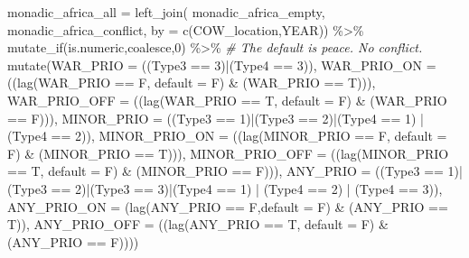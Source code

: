 \documentclass[
]{article}
\newenvironment{Shaded}{\begin{snugshade}}{\end{snugshade}}
\newcommand{\AttributeTok}[1]{\textcolor[rgb]{0.77,0.63,0.00}{#1}}
\newcommand{\CommentTok}[1]{\textcolor[rgb]{0.56,0.35,0.01}{\textit{#1}}}
\newcommand{\DecValTok}[1]{\textcolor[rgb]{0.00,0.00,0.81}{#1}}
\newcommand{\FunctionTok}[1]{\textcolor[rgb]{0.00,0.00,0.00}{#1}}
\newcommand{\NormalTok}[1]{#1}
\newcommand{\OtherTok}[1]{\textcolor[rgb]{0.56,0.35,0.01}{#1}}
\newcommand{\SpecialCharTok}[1]{\textcolor[rgb]{0.00,0.00,0.00}{#1}}
\newcommand{\StringTok}[1]{\textcolor[rgb]{0.31,0.60,0.02}{#1}}
\begin{document}
\begin{Shaded}
\begin{Highlighting}[]
\NormalTok{monadic\_africa\_all }\OtherTok{=} \FunctionTok{left\_join}\NormalTok{(}
\NormalTok{  monadic\_africa\_empty, }
\NormalTok{  monadic\_africa\_conflict, }
  \AttributeTok{by =} \FunctionTok{c}\NormalTok{(}\StringTok{\textquotesingle{}COW\_location\textquotesingle{}}\NormalTok{,}\StringTok{\textquotesingle{}YEAR\textquotesingle{}}\NormalTok{))  }\SpecialCharTok{\%\textgreater{}\%} 
  \FunctionTok{mutate\_if}\NormalTok{(is.numeric,coalesce,}\DecValTok{0}\NormalTok{) }\SpecialCharTok{\%\textgreater{}\%} \CommentTok{\# The default is peace. No conflict.}
  \FunctionTok{mutate}\NormalTok{(}\AttributeTok{WAR\_PRIO =}\NormalTok{ ((Type3 }\SpecialCharTok{==} \DecValTok{3}\NormalTok{)}\SpecialCharTok{|}\NormalTok{(Type4 }\SpecialCharTok{==} \DecValTok{3}\NormalTok{)), }
         \AttributeTok{WAR\_PRIO\_ON =}\NormalTok{ ((}\FunctionTok{lag}\NormalTok{(WAR\_PRIO }\SpecialCharTok{==}\NormalTok{ F, }\AttributeTok{default =}\NormalTok{ F) }\SpecialCharTok{\&}\NormalTok{ (WAR\_PRIO }\SpecialCharTok{==}\NormalTok{ T))),}
         \AttributeTok{WAR\_PRIO\_OFF =}\NormalTok{ ((}\FunctionTok{lag}\NormalTok{(WAR\_PRIO }\SpecialCharTok{==}\NormalTok{ T, }\AttributeTok{default =}\NormalTok{ F) }\SpecialCharTok{\&}\NormalTok{ (WAR\_PRIO }\SpecialCharTok{==}\NormalTok{ F))), }
         \AttributeTok{MINOR\_PRIO =}\NormalTok{ ((Type3 }\SpecialCharTok{==} \DecValTok{1}\NormalTok{)}\SpecialCharTok{|}\NormalTok{(Type3 }\SpecialCharTok{==} \DecValTok{2}\NormalTok{)}\SpecialCharTok{|}\NormalTok{(Type4 }\SpecialCharTok{==} \DecValTok{1}\NormalTok{) }\SpecialCharTok{|}\NormalTok{ (Type4 }\SpecialCharTok{==} \DecValTok{2}\NormalTok{)), }
         \AttributeTok{MINOR\_PRIO\_ON =}\NormalTok{ ((}\FunctionTok{lag}\NormalTok{(MINOR\_PRIO }\SpecialCharTok{==}\NormalTok{ F, }\AttributeTok{default =}\NormalTok{ F) }\SpecialCharTok{\&}\NormalTok{ (MINOR\_PRIO }\SpecialCharTok{==}\NormalTok{ T))), }
         \AttributeTok{MINOR\_PRIO\_OFF =}\NormalTok{ ((}\FunctionTok{lag}\NormalTok{(MINOR\_PRIO }\SpecialCharTok{==}\NormalTok{ T, }\AttributeTok{default =}\NormalTok{ F) }\SpecialCharTok{\&}\NormalTok{ (MINOR\_PRIO }\SpecialCharTok{==}\NormalTok{ F))), }
         \AttributeTok{ANY\_PRIO =}\NormalTok{ ((Type3 }\SpecialCharTok{==} \DecValTok{1}\NormalTok{)}\SpecialCharTok{|}\NormalTok{(Type3 }\SpecialCharTok{==} \DecValTok{2}\NormalTok{)}\SpecialCharTok{|}\NormalTok{(Type3 }\SpecialCharTok{==} \DecValTok{3}\NormalTok{)}\SpecialCharTok{|}\NormalTok{(Type4 }\SpecialCharTok{==} \DecValTok{1}\NormalTok{) }\SpecialCharTok{|}\NormalTok{ (Type4 }\SpecialCharTok{==} \DecValTok{2}\NormalTok{) }\SpecialCharTok{|}\NormalTok{ (Type4 }\SpecialCharTok{==} \DecValTok{3}\NormalTok{)), }
         \AttributeTok{ANY\_PRIO\_ON =}\NormalTok{ (}\FunctionTok{lag}\NormalTok{(ANY\_PRIO }\SpecialCharTok{==}\NormalTok{ F,}\AttributeTok{default =}\NormalTok{ F) }\SpecialCharTok{\&}\NormalTok{ (ANY\_PRIO }\SpecialCharTok{==}\NormalTok{ T)),}
         \AttributeTok{ANY\_PRIO\_OFF =}\NormalTok{ ((}\FunctionTok{lag}\NormalTok{(ANY\_PRIO }\SpecialCharTok{==}\NormalTok{ T, }\AttributeTok{default =}\NormalTok{ F) }\SpecialCharTok{\&}\NormalTok{ (ANY\_PRIO }\SpecialCharTok{==}\NormalTok{ F)))) }


\end{Highlighting}
\end{Shaded}
\end{document}

